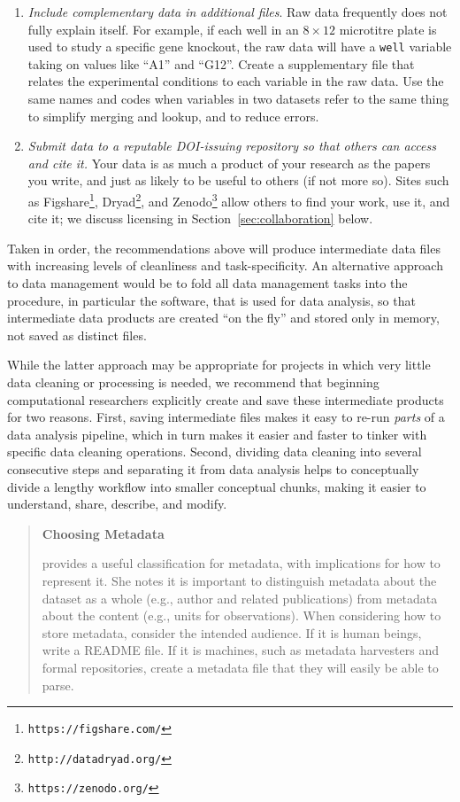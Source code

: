 \documentclass[10pt]{article}
\newcommand{\recommend}[1]{\textit{#1}}
\newcommand{\withurl}[2]{{#1}\footnote{\texttt{#2}}}
\begin{document}
\begin{enumerate}
\item
  \recommend{Include complementary data in additional files}.  Raw data
  frequently does not fully explain
  itself. For example, if each well in an $8{\times}12$ microtitre
  plate is used to study a specific gene knockout, the raw
  data will have a \texttt{well} variable taking on values like ``A1''
  and ``G12''. Create a supplementary file that relates the experimental
  conditions to each variable in the raw data. Use the
  same names and codes when variables in two
  datasets refer to the same thing to simplify merging and lookup, and
  to reduce errors.

\item
  \recommend{Submit data to a reputable DOI-issuing repository so that
    others can access and cite it.}  Your data is as much a product of
  your research as the papers you write, and just as likely to be
  useful to others (if not more so).  Sites such as
  \withurl{Figshare}{https://figshare.com/},
  \withurl{Dryad}{http://datadryad.org/}, and
  \withurl{Zenodo}{https://zenodo.org/} allow others to find your work,
  use it, and cite it; we discuss licensing in
  Section~\ref{sec:collaboration} below.

\end{enumerate}

Taken in order, the recommendations above will produce intermediate
data files with increasing levels of cleanliness and
task-specificity. An alternative approach to data management would be
to fold all data management tasks into the procedure, in particular
the software, that is used for data analysis, so that intermediate
data products are created ``on the fly'' and stored only in memory,
not saved as distinct files.

While the latter approach may be appropriate for projects in which
very little data cleaning or processing is needed, we recommend that
beginning computational researchers explicitly create and save these
intermediate products for two reasons.  First, saving intermediate
files makes it easy to re-run \emph{parts} of a data analysis
pipeline, which in turn makes it easier and faster to tinker with
specific data cleaning operations.  Second, dividing data cleaning
into several consecutive steps and separating it from data analysis
helps to conceptually divide a lengthy workflow into smaller
conceptual chunks, making it easier to understand, share, describe, and modify.

\begin{quote}
  \noindent \textbf{Choosing Metadata}

  \cite{wickes2015} provides a useful classification for metadata,
  with implications for how to represent it. She notes it is important
  to distinguish metadata about the dataset as a whole (e.g., author
  and related publications) from metadata about the content (e.g.,
  units for observations).  When considering how to store metadata,
  consider the intended audience. If it is human beings, write a
  README file. If it is machines, such as metadata harvesters and
  formal repositories, create a metadata file that they will easily be
  able to parse.
\end{quote}
\end{document}
